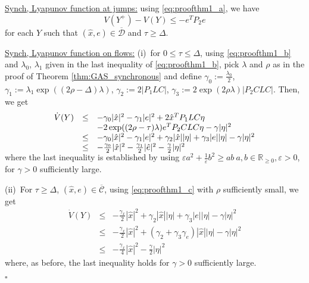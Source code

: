 \documentclass[twocolumn]{autart}
\newenvironment{proofof}{\noindent {\em Proof of }}{\hfill \hspace*{1pt}
\hfill $\square$}
\newcommand\real{\ensuremath{{\mathbb R}}}
\begin{document}
\begin{proofof}{\emph{Theorem \ref{thm:GASoutput}}.}
{ \underline{Synch, Lyapunov function at jumps:}} 
using \eqref{eq:proofthm1_a}, we have 
\begin{equation}
\label{eq:proofthm3_a}
 V(Y^+) - V(Y)\leq -e^TP_2e  
\end{equation}
for each $Y$ such that $(\hat{x},e)\in\overline{\mathcal{D}}$ and $\tau\geq \Delta$. 

{ \underline{Synch, Lyapunov function on flows:}} 
(i)~for $0 \leq \tau \leq \Delta$, using \eqref{eq:proofthm1_b} and $\lambda_0$, $\lambda_1$
given in the last inequality of \eqref{eq:proofthm1_b}, pick $\lambda$ and $\rho$ as in 
the proof of Theorem \ref{thm:GAS_synchronous} and define
$\gamma_0 := \frac{\lambda_0}{2}$, 
$\gamma_1 := \lambda_1\exp((2\rho-\Delta)\lambda)$, 
$\gamma_2 := 2|P_1 L C|$, 
$\gamma_3 := 2\exp(2\rho\lambda)|P_2 C L C |$.
Then, we get 
\begin{equation}
\label{eq:proofthm3_b}
 \begin{array}{lll}
  \dot{V}(Y) 
&\leq&  -\gamma_0 |\hat{x}|^2 - \gamma_1|e|^2 + 2\hat{x}^T P_1LC\eta \\
& &- 2\exp((2\rho-\tau)\lambda)e^TP_2CLC\eta -\gamma|\eta|^2 \\
&\leq&  -\gamma_0 |\hat{x}|^2 - \gamma_1|e|^2 + \gamma_2|\hat{x}||\eta| + \gamma_3|e||\eta| -\gamma|\eta|^2 \\
&\leq&  -\frac{\gamma_0 }{2} |\hat{x}|^2 -\frac{\gamma_1 }{2} |\hat{e}|^2 -\frac{\gamma }{2} |\eta|^2 \vspace{-3mm}
 \end{array} \vspace{1mm}
\end{equation}
where the last inequality is established by using 
$\varepsilon  a^2 + \frac{1}{\varepsilon}b^2 \geq ab \ a,b \in \real_{\geq 0},  \varepsilon>0$, 
for $\gamma>0$ sufficiently large.

(ii)~For $\tau \geq \Delta$, $(\hat{x},e) \in \overline{\mathcal{C}}$, 
using \eqref{eq:proofthm1_c} with $\rho$ sufficiently small, we get
\begin{equation}
\label{eq:proofthm3_c}
 \begin{array}{lll}
  \dot{V}(Y) 
&\leq&  -\frac{\gamma_x }{2} |\hat{x}|^2 + \gamma_2|\hat{x}||\eta| + \gamma_3|e||\eta| -\gamma|\eta|^2 \\
&\leq&  -\frac{\gamma_x }{2} |\hat{x}|^2 + (\gamma_2 + \gamma_3\gamma_e)|\hat{x}||\eta| -\gamma|\eta|^2 \\
&\leq&  -\frac{\gamma_x }{4} |\hat{x}|^2 -\frac{\gamma }{2} |\eta|^2 
 \end{array}
\end{equation}
where, as before, the last inequality holds for $\gamma>0$ sufficiently large.


\end{proofof}
\end{document}
